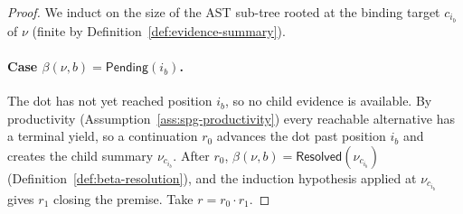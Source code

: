 \begin{proof}
	We induct on the size of the AST sub-tree rooted at the binding target $c_{i_b}$ of $\nu$ (finite by Definition~\ref{def:evidence-summary}).

	\paragraph{Case $\beta(\nu,b) = \mathsf{Pending}(i_b)$.} The dot has not yet reached position $i_b$, so no child evidence is available. By productivity (Assumption~\ref{ass:spg-productivity}) every reachable alternative has a terminal yield, so a continuation $r_0$ advances the dot past position $i_b$ and creates the child summary $\nu_{c_{i_b}}$. After $r_0$, $\beta(\nu,b) = \mathsf{Resolved}(\nu_{c_{i_b}})$ (Definition~\ref{def:beta-resolution}), and the induction hypothesis applied at $\nu_{c_{i_b}}$ gives $r_1$ closing the premise. Take $r = r_0 \cdot r_1$.


\end{proof}
